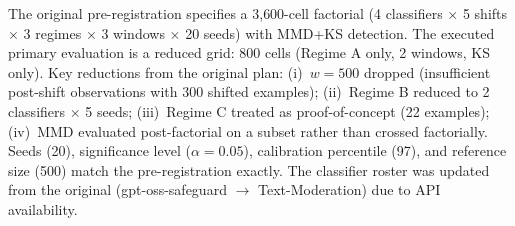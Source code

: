 \documentclass{article}
\begin{document}
The original pre-registration specifies a 3{,}600-cell factorial (4 classifiers $\times$ 5 shifts $\times$ 3 regimes $\times$ 3 windows $\times$ 20 seeds) with MMD+KS detection. The executed primary evaluation is a reduced grid: 800 cells (Regime A only, 2 windows, KS only). Key reductions from the original plan: (i)~$w{=}500$ dropped (insufficient post-shift observations with 300 shifted examples); (ii)~Regime B reduced to 2 classifiers $\times$ 5 seeds; (iii)~Regime C treated as proof-of-concept (22 examples); (iv)~MMD evaluated post-factorial on a subset rather than crossed factorially. Seeds (20), significance level ($\alpha{=}0.05$), calibration percentile (97), and reference size (500) match the pre-registration exactly. The classifier roster was updated from the original (gpt-oss-safeguard $\to$ Text-Moderation) due to API availability.
\end{document}
